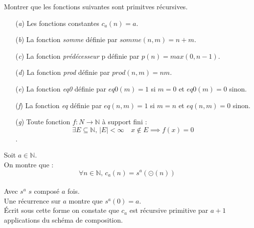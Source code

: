 \documentclass[12pt,letterpaper,boxed]{hmcpset}
\begin{document}

\begin{problem}[Question 1]
Montrer que les fonctions suivantes sont primitves récursives.
\begin{itemize}
  \item[(\textit{a})] Les fonctions constantes $c_{a}(n)=a$.
  \item[(\textit{b})] La fonction \textit{somme} définie par $somme(n,m) = n+m$.
  \item[(\textit{c})] La fonction \textit{prédécesseur} p définie par $p(n) = max(0,n-1)$.
  \item[(\textit{d})] La fonction \textit{prod} définie par $prod(n,m) = nm$.
  \item[(\textit{e})] La fonction \textit{eq0} définie par $eq0(m) = 1$ si $m = 0$ et $eq0(m) = 0$ sinon.
  \item[(\textit{f})]  La fonction \textit{eq} définie par $eq(n,m) = 1$ si $m = n$ et $eq(n,m) = 0$ sinon.
  \item[(\textit{g})] Toute fonction $f : N \to \mathbb{N}$ à support fini : $$\exists E \subseteq \mathbb{N}, \, |E| < \infty \quad x \notin E \implies f(x) = 0$$.
\end{itemize}


\end{problem}

\begin{solution}[(a)]
Soit $a \in \mathbb{N}$.\\ On montre que : 
$$  \boxed{\forall n \in \mathbb{N}, \, c_{a}(n) = s^{a}(\odot(n))} $$ 
\\

\noindent Avec $s^{a}$ $s$ composé $a$ fois. \\
Une récurrence sur $a$ montre que $s^a(0) = a$. \\
Écrit sous cette forme on constate que $c_{a}$ est récursive primitive par $a+1$ applications du schéma de composition. \\


\end{solution}
\end{document}
